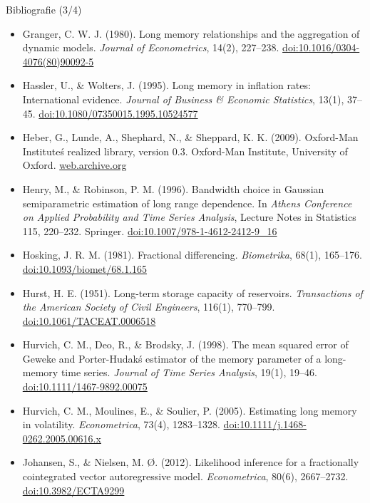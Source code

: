 \begin{frame}{Bibliografie (3/4)}
\itemsize{\tiny}
\begin{itemize}
    \item Granger, C. W. J. (1980). Long memory relationships and the aggregation of dynamic models. \textit{Journal of Econometrics}, 14(2), 227--238. \href{https://doi.org/10.1016/0304-4076(80)90092-5}{doi:10.1016/0304-4076(80)90092-5}
    \item Hassler, U., \& Wolters, J. (1995). Long memory in inflation rates: International evidence. \textit{Journal of Business \& Economic Statistics}, 13(1), 37--45. \href{https://doi.org/10.1080/07350015.1995.10524577}{doi:10.1080/07350015.1995.10524577}
    \item Heber, G., Lunde, A., Shephard, N., \& Sheppard, K. K. (2009). Oxford-Man Institute\'s realized library, version 0.3. Oxford-Man Institute, University of Oxford. \href{https://web.archive.org/web/20220301022212/https://realized.oxford-man.ox.ac.uk/}{web.archive.org}
    \item Henry, M., \& Robinson, P. M. (1996). Bandwidth choice in Gaussian semiparametric estimation of long range dependence. In \textit{Athens Conference on Applied Probability and Time Series Analysis}, Lecture Notes in Statistics 115, 220--232. Springer. \href{https://doi.org/10.1007/978-1-4612-2412-9_16}{doi:10.1007/978-1-4612-2412-9\_16}
    \item Hosking, J. R. M. (1981). Fractional differencing. \textit{Biometrika}, 68(1), 165--176. \href{https://doi.org/10.1093/biomet/68.1.165}{doi:10.1093/biomet/68.1.165}
    \item Hurst, H. E. (1951). Long-term storage capacity of reservoirs. \textit{Transactions of the American Society of Civil Engineers}, 116(1), 770--799. \href{https://doi.org/10.1061/TACEAT.0006518}{doi:10.1061/TACEAT.0006518}
    \item Hurvich, C. M., Deo, R., \& Brodsky, J. (1998). The mean squared error of Geweke and Porter-Hudak\'s estimator of the memory parameter of a long-memory time series. \textit{Journal of Time Series Analysis}, 19(1), 19--46. \href{https://doi.org/10.1111/1467-9892.00075}{doi:10.1111/1467-9892.00075}
    \item Hurvich, C. M., Moulines, E., \& Soulier, P. (2005). Estimating long memory in volatility. \textit{Econometrica}, 73(4), 1283--1328. \href{https://doi.org/10.1111/j.1468-0262.2005.00616.x}{doi:10.1111/j.1468-0262.2005.00616.x}
    \item Johansen, S., \& Nielsen, M. Ø. (2012). Likelihood inference for a fractionally cointegrated vector autoregressive model. \textit{Econometrica}, 80(6), 2667--2732. \href{https://doi.org/10.3982/ECTA9299}{doi:10.3982/ECTA9299}

\end{itemize}
\end{frame}
